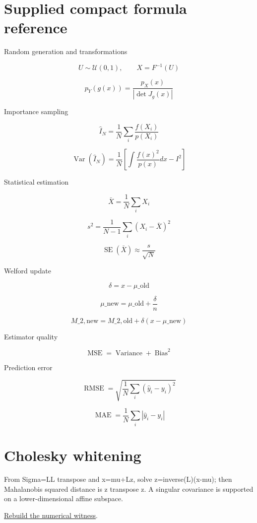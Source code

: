 \section{Supplied compact formula reference}\label{appendix-cb5af353ef77-supplied-compact-formula-reference}

Random generation and transformations

\[
 U\sim\mathcal U(0,1),\qquad X=F^{-1}(U) 
\]

\[
 p_Y(g(x)) = \frac{p_X(x)}{|\det J_g(x)|} 
\]

Importance sampling

\[
 \widehat I_N= \frac1N\sum_i\frac{f(X_i)}{p(X_i)} 
\]

\[
 \operatorname{Var}(\widehat I_N) = \frac1N \left[ \int\frac{f(x)^2}{p(x)}dx-I^2 \right] 
\]

Statistical estimation

\[
 \bar X=\frac1N\sum_iX_i 
\]

\[
 s^2=\frac1{N-1}\sum_i(X_i-\bar X)^2 
\]

\[
 \operatorname{SE}(\bar X)\approx\frac{s}{\sqrt N} 
\]

Welford update

\[
 \delta=x-\mu\_{\mathrm{old}} 
\]

\[
 \mu\_{\mathrm{new}}= \mu\_{\mathrm{old}}+\frac{\delta}{n} 
\]

\[
 M\_{2,\mathrm{new}}= M\_{2,\mathrm{old}}+ \delta(x-\mu\_{\mathrm{new}}) 
\]

Estimator quality

\[
 \operatorname{MSE}= \operatorname{Variance}+ \operatorname{Bias}^2 
\]

Prediction error

\[
 \operatorname{RMSE}= \sqrt{\frac1N\sum_i(\hat y_i-y_i)^2} 
\]

\[
 \operatorname{MAE}= \frac1N\sum_i|\hat y_i-y_i| 
\]

\section{Cholesky whitening}\label{appendix-cb5af353ef77-cholesky-whitening}

From Sigma=LL transpose and x=mu+Lz, solve z=inverse(L)(x-mu); then Mahalanobis squared distance is z transpose z. A singular covariance is supported on a lower-dimensional affine subspace.

\href{Continuous\%20Notes/Computing\%20Foundations\%20-\%20From\%20Bits\%20to\%20C++\%20and\%20Systems\%20APIs\#Original\%20bridge:\%20whiten\%20a\%20covariance\%20ellipse}{Rebuild the numerical witness}.

